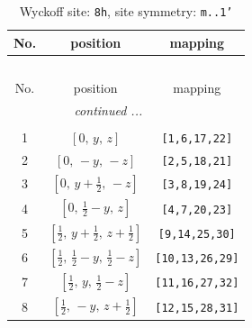 \documentclass[fleqn,8pt]{jsarticle}
\begin{document}
\begin{longtable}{ccc}
\caption{Wyckoff site: {\tt 8h}, site symmetry: {\tt m..1'}}
 \\
 \hline \hline
No. & position & mapping \\ \hline \endfirsthead

\multicolumn{2}{l}{\tablename\ \thetable{}} \\
 \hline \hline
No. & position & mapping \\ \hline \endhead

 \hline \hline
\multicolumn{2}{r}{\footnotesize\it continued ...} \\ \endfoot

 \hline \hline
\multicolumn{2}{r}{} \\ \endlastfoot

1 & $\left[ 0,\, y,\, z \right]$ & {\tt [1,6,17,22]} \\ \hline
2 & $\left[ 0,\, - y,\, - z \right]$ & {\tt [2,5,18,21]} \\ \hline
3 & $\left[ 0,\, y + \frac{1}{2},\, - z \right]$ & {\tt [3,8,19,24]} \\ \hline
4 & $\left[ 0,\, \frac{1}{2} - y,\, z \right]$ & {\tt [4,7,20,23]} \\ \hline
5 & $\left[ \frac{1}{2},\, y + \frac{1}{2},\, z + \frac{1}{2} \right]$ & {\tt [9,14,25,30]} \\ \hline
6 & $\left[ \frac{1}{2},\, \frac{1}{2} - y,\, \frac{1}{2} - z \right]$ & {\tt [10,13,26,29]} \\ \hline
7 & $\left[ \frac{1}{2},\, y,\, \frac{1}{2} - z \right]$ & {\tt [11,16,27,32]} \\ \hline
8 & $\left[ \frac{1}{2},\, - y,\, z + \frac{1}{2} \right]$ & {\tt [12,15,28,31]} \\
\end{longtable}
\renewcommand{\arraystretch}{1.2}
\end{document}
